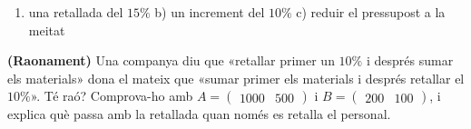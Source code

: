 \begin{exercicis}
\begin{exlist}
        \begin{enumerate}[label=\alph*), leftmargin=1.6em, topsep=2pt]
          \item una retallada del $15\%$ \quad b) un increment del $10\%$ \quad
                c) reduir el pressupost a la meitat
        \end{enumerate}
  \item \textbf{(Raonament)} Una companya diu que «retallar primer un $10\%$ i
        després sumar els materials» dona el mateix que «sumar primer els materials
        i després retallar el $10\%$». Té raó? Comprova-ho amb
        $A=\begin{pmatrix} 1000 & 500 \end{pmatrix}$ i
        $B=\begin{pmatrix} 200 & 100 \end{pmatrix}$, i explica què passa amb la
        retallada quan només es retalla el personal.
\end{exlist}
\end{exercicis}

